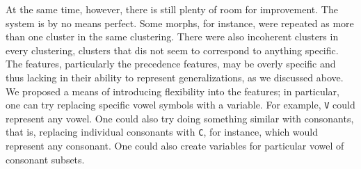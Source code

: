 At the same time, however, there is still plenty of room for improvement. The system is by no means perfect. Some morphs, for instance, were repeated as more than one cluster in the same clustering. There were also incoherent clusters in every clustering, clusters that dis not seem to correspond to anything specific.
The features, particularly the precedence features, may be overly specific and thus lacking in their ability to represent generalizations, as we discussed above. We proposed a means of introducing flexibility into the features; in particular, one can try replacing specific vowel symbols with a variable. For example, \texttt{V} could represent any vowel. One could also try doing something similar with consonants, that is, replacing individual consonants with \texttt{C}, for instance, which would represent any consonant. One could also create variables for particular vowel of consonant subsets. %



%


